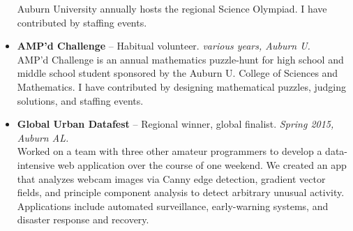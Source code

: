 \documentclass[11pt]{article}
\begin{document}
\begin{itemize}
        Auburn University annually hosts the regional Science Olympiad.
        I have contributed by staffing events.
    \item{}
      {\bf AMP'd Challenge} --
      {Habitual volunteer.}
      {\em various years, Auburn U.}\\
        AMP'd Challenge is an annual mathematics puzzle-hunt for high
        school and middle school student sponsored by the Auburn U.
        College of Sciences and Mathematics. I have contributed by
        designing mathematical puzzles, judging solutions, and staffing
        events.
    \item{}
      {\bf Global Urban Datafest} --
      {Regional winner, global finalist.}
      {\em Spring 2015, Auburn AL.}\\
        Worked on a team with three other amateur programmers to develop
        a data-intensive web application over the course of one weekend.
        We created an app that analyzes webcam images via Canny edge
        detection, gradient vector fields, and principle component
        analysis to detect arbitrary unusual activity. Applications
        include automated surveillance, early-warning systems, and
        disaster response and recovery.
  \end{itemize}

\label{page:last}
\end{document}
